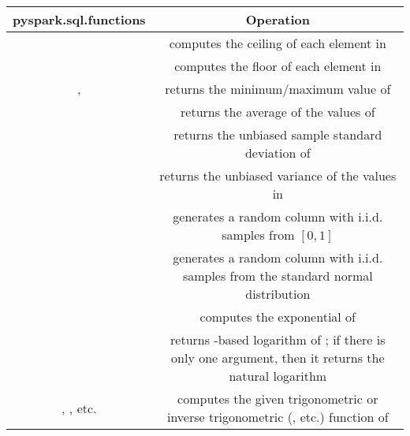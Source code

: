 \begin{table}[H]
\begin{tabular}{|c|C|}
\hline
\textbf{pyspark.sql.functions} & \textbf{Operation}\\
\hline
{} & computes the ceiling of each element in \\
\hline
{} & computes the floor of each element in \\
\hline
{},  & returns the minimum/maximum value of \\
\hline
{} & returns the average of the values of \\
\hline
{} & returns the unbiased sample standard deviation of \\
\hline
{} & returns the unbiased variance of the values in \\
\hline
{} & generates a random column with i.i.d. samples from $[0, 1]$\\
\hline
{} & generates a random column with i.i.d. samples from the standard normal distribution\\
\hline
{} & computes the exponential of \\
\hline
{} & returns -based logarithm of ; if there is only one argument, then it returns the natural logarithm\\
\hline
{}, , etc. & computes the given trigonometric or inverse trigonometric (, etc.) function of \\
\hline
\end{tabular}
\end{table}
